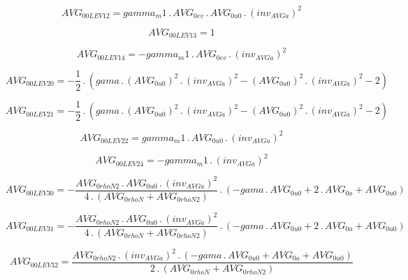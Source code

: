 \documentclass{article}
\begin{document}
\begin{dmath}AVG_{0 0 LEV 12} = gamma_m1 \,.\, AVG_{0 ev} \,.\, AVG_{0 u0} \,.\, \left(inv_{AVG a} \right)^{2}\end{dmath}

\begin{dmath}AVG_{0 0 LEV 13} = 1\end{dmath}

\begin{dmath}AVG_{0 0 LEV 14} = - gamma_m1 \,.\, AVG_{0 ev} \,.\, \left(inv_{AVG a} \right)^{2}\end{dmath}

\begin{dmath}AVG_{0 0 LEV 20} = - \frac{1}{2} \,.\, \left(gama \,.\, \left(AVG_{0 u0} \right)^{2} \,.\, \left(inv_{AVG a} \right)^{2} - \left(AVG_{0 u0} \right)^{2} \,.\, \left(inv_{AVG a} \right)^{2} - 2\right)\end{dmath}

\begin{dmath}AVG_{0 0 LEV 21} = - \frac{1}{2} \,.\, \left(gama \,.\, \left(AVG_{0 u0} \right)^{2} \,.\, \left(inv_{AVG a} \right)^{2} - \left(AVG_{0 u0} \right)^{2} \,.\, \left(inv_{AVG a} \right)^{2} - 2\right)\end{dmath}

\begin{dmath}AVG_{0 0 LEV 22} = gamma_m1 \,.\, AVG_{0 u0} \,.\, \left(inv_{AVG a} \right)^{2}\end{dmath}

\begin{dmath}AVG_{0 0 LEV 24} = - gamma_m1 \,.\, \left(inv_{AVG a} \right)^{2}\end{dmath}

\begin{dmath}AVG_{0 0 LEV 30} = - \frac{AVG_{0 rhoN2} \,.\, AVG_{0 u0} \,.\, \left(inv_{AVG a} \right)^{2}}{4 \,.\, \left(AVG_{0 rhoN} + AVG_{0 rhoN2}\right)} \,.\, \left(- gama \,.\, AVG_{0 u0} + 2 \,.\, AVG_{0 a} + AVG_{0 u0}\right)\end{dmath}

\begin{dmath}AVG_{0 0 LEV 31} = - \frac{AVG_{0 rhoN2} \,.\, AVG_{0 u0} \,.\, \left(inv_{AVG a} \right)^{2}}{4 \,.\, \left(AVG_{0 rhoN} + AVG_{0 rhoN2}\right)} \,.\, \left(- gama \,.\, AVG_{0 u0} + 2 \,.\, AVG_{0 a} + AVG_{0 u0}\right)\end{dmath}

\begin{dmath}AVG_{0 0 LEV 32} = \frac{AVG_{0 rhoN2} \,.\, \left(inv_{AVG a} \right)^{2} \,.\, \left(- gama \,.\, AVG_{0 u0} + AVG_{0 a} + AVG_{0 u0}\right)}{2 \,.\, \left(AVG_{0 rhoN} + AVG_{0 rhoN2}\right)}\end{dmath}
\end{document}
